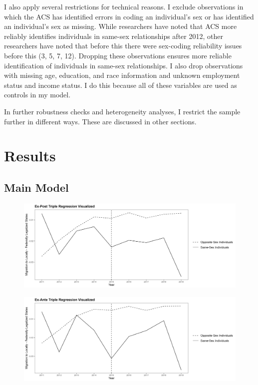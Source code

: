 \documentclass[12pt,letterpaper]{article}
\begin{document}
I also apply several restrictions for technical reasons. I exclude observations in which the ACS has identified errors in coding an individual’s sex or has identified an individual’s sex as missing. While researchers have noted that ACS more reliably identifies individuals in same-sex relationships after 2012, other researchers have noted that before this there were sex-coding reliability issues before this (3, 5, 7, 12). Dropping these observations ensures more reliable identification of individuals in same-sex relationships. I also drop observations with missing age, education, and race information and unknown employment status and income status. I do this because all of these variables are used as controls in my model.

\begin{landscape}

\end{landscape}

In further robustness checks and heterogeneity analyses, I restrict the sample further in different ways. These are discussed in other sections. 

\clearpage

\section{Results}


\subsection{Main Model}
\clearpage
\begin{figure}
    \centering
    \includegraphics[width=1\linewidth]{outputs/summary_stats/post_diffs.png}
    \label{fig:enter-label}
\end{figure}



\begin{figure}
    \centering
    \includegraphics[width=1\linewidth]{outputs/summary_stats/ante_diffs.png}
    \label{fig:enter-label}
\end{figure}
\end{document}
